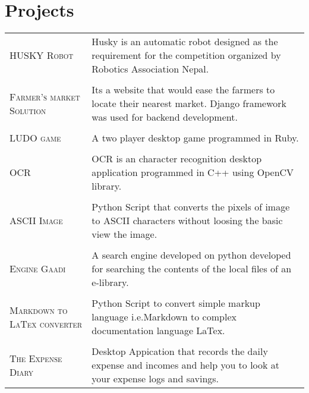 \documentclass[a4paper,10pt]{article}
\begin{document}
\section{Projects}
\begin{tabular}{p{3cm}|p{10.6cm}}
\textsc{HUSKY Robot} & \small{Husky is an automatic robot designed as the requirement for the competition organized by Robotics Association Nepal.}
\\\multicolumn{2}{c}{} \\

\textsc{Farmer's market Solution} & \small{Its a website that would ease the farmers to locate their nearest market. Django framework was used for backend development.}
\\\multicolumn{2}{c}{} \\

\textsc{LUDO game} &  \small{A two player desktop game programmed in Ruby.}
\\\multicolumn{2}{c}{} \\

\textsc{OCR} & \small{OCR is an character recognition desktop application programmed in C++ using OpenCV library.}
\\\multicolumn{2}{c}{} \\

\textsc{ASCII Image} & \small{Python Script that converts the pixels of image to ASCII characters without loosing the basic view the image.}
\\\multicolumn{2}{c}{} \\

\textsc{Engine Gaadi} & \small{A search engine developed on python developed for searching the contents of the local files of an e-library.}
\\\multicolumn{2}{c}{} \\

\textsc{Markdown to LaTex converter}&\small{Python Script to convert simple markup language i.e.Markdown to complex documentation language LaTex.}
\\\multicolumn{2}{c}{} \\

 \textsc{The Expense Diary} & \small{Desktop Appication that records the daily expense and incomes and help you to look at your expense logs and savings.}
\end{tabular}
\end{document}
